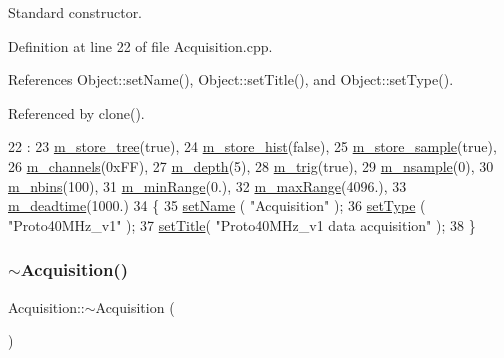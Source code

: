 Standard constructor. 



Definition at line 22 of file Acquisition.\+cpp.



References Object\+::set\+Name(), Object\+::set\+Title(), and Object\+::set\+Type().



Referenced by clone().


\begin{DoxyCode}
22                            :
23   \hyperlink{classAcquisition_aca2143e9135e25554e58327475a767c5}{m\_store\_tree}(\textcolor{keyword}{true}),
24   \hyperlink{classAcquisition_a08f70edd83751dbdab4c8190dc4b9188}{m\_store\_hist}(\textcolor{keyword}{false}),
25   \hyperlink{classAcquisition_a987cc1d04007cf1f5acc1accfd0909e5}{m\_store\_sample}(\textcolor{keyword}{true}),
26   \hyperlink{classAcquisition_aedc8b29f322ef00540797fbd0d5112d1}{m\_channels}(0xFF),
27   \hyperlink{classAcquisition_a26628424533a2dd74d24712a14637a72}{m\_depth}(5),
28   \hyperlink{classAcquisition_a953bdc1bf56206b6df33b648af32a24f}{m\_trig}(\textcolor{keyword}{true}),
29   \hyperlink{classAcquisition_a26d0f1a44309ffac49c365b7ee568ab2}{m\_nsample}(0),
30   \hyperlink{classAcquisition_a05bccdc4b9ada37beaeba8794ccef12d}{m\_nbins}(100),
31   \hyperlink{classAcquisition_a06b3ea027ebdcb15f64a6517ceb99b76}{m\_minRange}(0.),
32   \hyperlink{classAcquisition_a45478629e9db582470b4b158edb46616}{m\_maxRange}(4096.),
33   \hyperlink{classAcquisition_a5f7fe20506e7d860ed61935255adfe17}{m\_deadtime}(1000.)
34 \{
35   \hyperlink{classObject_ae30fea75683c2d149b6b6d17c09ecd0c}{setName} ( \textcolor{stringliteral}{"Acquisition"} );
36   \hyperlink{classObject_aae534cc9d982bcb9b99fd505f2e103a5}{setType} ( \textcolor{stringliteral}{"Proto40MHz\_v1"} );
37   \hyperlink{classObject_a89557dbbad5bcaa02652f5d7fa35d20f}{setTitle}( \textcolor{stringliteral}{"Proto40MHz\_v1 data acquisition"} );
38 \}
\end{DoxyCode}
\mbox{\label{classAcquisition_a3b0205ba385e2da70abb5a351c4dbf0f}} 
\subsubsection{\texorpdfstring{$\sim$\+Acquisition()}{~Acquisition()}\hspace{0.1cm}{\footnotesize\ttfamily [1/2]}}
{\footnotesize\ttfamily Acquisition\+::$\sim$\+Acquisition (\begin{DoxyParamCaption}{ }\end{DoxyParamCaption})\hspace{0.3cm}{\ttfamily [virtual]}}



